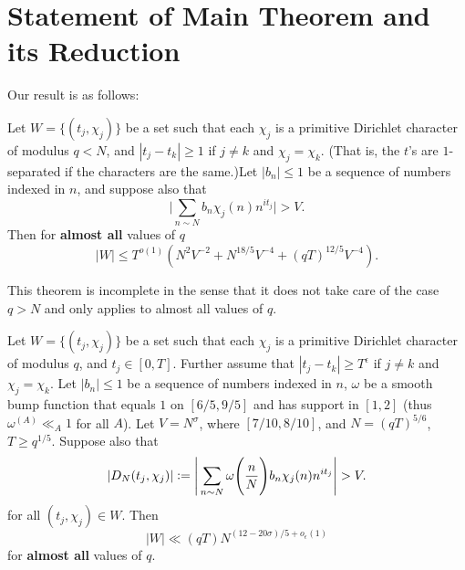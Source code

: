 \section{Statement of Main Theorem and its Reduction}
Our result is as follows: 
\begin{theorem}\label{incompletehybrid}
	Let $W=\{(t_j,\chi_j)\}$ be a set such that each $\chi_j$ is a primitive Dirichlet character of modulus $q<N$, and $|t_j-t_k|\geq 1$ if $j\neq k$ and $\chi_j=\chi_k$. (That is, the $t$'s are $1$-separated if the characters are the same.)Let $|b_n|\leq 1$ be a sequence of numbers indexed in $n$, and suppose also that \[
	\Bigg|\sum_{n\sim N} b_n\chi_j(n)n^{it_j} \Bigg|>V.
	\]
	Then for \textbf{almost all} values of $q$ \[
	|W|\leq T^{o(1)}(N^2V^{-2}+ N^{18/5}V^{-4}+(qT)^{12/5}V^{-4} ).
	\]
\end{theorem}
\begin{remark}
This theorem is incomplete in the sense that it does not take care of the case $q>N$ and only applies to almost all values of $q$.
\end{remark}
\begin{proposition}\label{mainthm}
    Let $W=\{(t_j,\chi_j)\}$ be a set such that each $\chi_j$ is a primitive Dirichlet character of modulus $q$, and $t_j\in[0,T]$. Further assume that $|t_j-t_k|\geq T^\epsilon$ if $j\neq k$ and $\chi_j=\chi_k$. Let $|b_n|\leq 1$ be a sequence of numbers indexed in $n$, $\omega$ be a smooth bump function that equals $1$ on $[6/5,9/5]$ and has support in $[1,2]$ (thus $\omega^{(A)}\ll_A 1$ for all $A$). Let $V=N^{\sigma}$, where $[7/10,8/10]$, and $N=(qT)^{5/6}$, $T\geq q^{1/5}$. Suppose also that \[
    |D_N(t_j,\chi_j)|\defeq\Bigg|\sum_{n\sim N} \omega\Bigg(\frac{n}{N}\Bigg)b_n\chi_j(n)n^{it_j} \Bigg|>V.
\]
for all $(t_j,\chi_j)\in W$.
Then \[
|W|\ll (qT)N^{(12-20\sigma)/5+o_{\epsilon}(1)}
\]
for \textbf{almost all} values of $q$.
\end{proposition}
